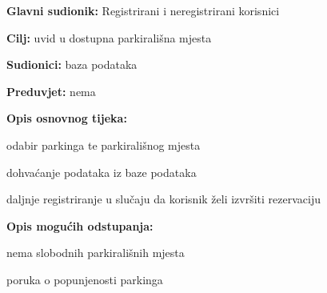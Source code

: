     				\begin{packed_item}
    					
    					\item \textbf{Glavni sudionik: } Registrirani i neregistrirani korisnici
    					\item  \textbf{Cilj:} uvid u dostupna parkirališna mjesta
    					\item  \textbf{Sudionici:} baza podataka
    					\item  \textbf{Preduvjet:} nema
    					\item  \textbf{Opis osnovnog tijeka:}
    					
    					\item[] \begin{packed_enum}
    						
    						\item odabir parkinga te parkirališnog mjesta
    						\item dohvaćanje podataka iz baze podataka
    						\item daljnje registriranje u slučaju da korisnik želi izvršiti rezervaciju

    					\end{packed_enum}
    					
    					\item  \textbf{Opis mogućih odstupanja:}
    					
    					\item[] \begin{packed_item}
    						
    						\item[2.a] nema slobodnih parkirališnih mjesta
    						\item[] \begin{packed_enum}
    							
    							\item poruka o popunjenosti parkinga
    							
    						\end{packed_enum}
    						
    					\end{packed_item}
    				\end{packed_item}
    				\noindent {}
